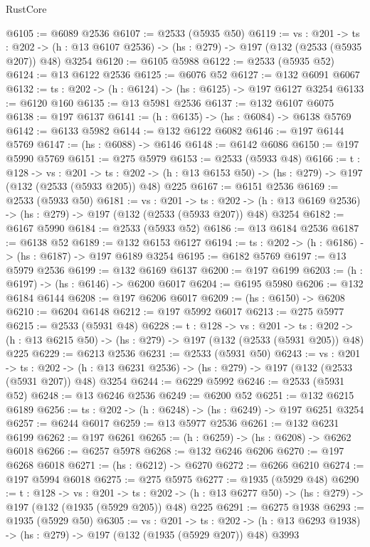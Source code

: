 \begin{lexlean}{RustCore}
\begin{coremodule}
@6105 := @6089 @2536
@6107 := @2533 (@5935 @50)
@6119 := {vs : @201} ->
  {ts : @202} -> (h : @13 @6107 @2536) -> (hs : @279) -> @197 (@132 (@2533 (@5935 @207)) @48) @3254
@6120 := @6105 @5988
@6122 := @2533 (@5935 @52)
@6124 := @13 @6122 @2536
@6125 := @6076 @52
@6127 := @132 @6091 @6067
@6132 := {ts : @202} -> (h : @6124) -> (hs : @6125) -> @197 @6127 @3254
@6133 := @6120 @160
@6135 := @13 @5981 @2536
@6137 := @132 @6107 @6075
@6138 := @197 @6137
@6141 := (h : @6135) -> (hs : @6084) -> @6138 @5769
@6142 := @6133 @5982
@6144 := @132 @6122 @6082
@6146 := @197 @6144 @5769
@6147 := (hs : @6088) -> @6146
@6148 := @6142 @6086
@6150 := @197 @5990 @5769
@6151 := @275 @5979
@6153 := @2533 (@5933 @48)
@6166 := {t : @128} ->
  {vs : @201} ->
  {ts : @202} -> (h : @13 @6153 @50) -> (hs : @279) -> @197 (@132 (@2533 (@5933 @205)) @48) @225
@6167 := @6151 @2536
@6169 := @2533 (@5933 @50)
@6181 := {vs : @201} ->
  {ts : @202} -> (h : @13 @6169 @2536) -> (hs : @279) -> @197 (@132 (@2533 (@5933 @207)) @48) @3254
@6182 := @6167 @5990
@6184 := @2533 (@5933 @52)
@6186 := @13 @6184 @2536
@6187 := @6138 @52
@6189 := @132 @6153 @6127
@6194 := {ts : @202} -> (h : @6186) -> (hs : @6187) -> @197 @6189 @3254
@6195 := @6182 @5769
@6197 := @13 @5979 @2536
@6199 := @132 @6169 @6137
@6200 := @197 @6199
@6203 := (h : @6197) -> (hs : @6146) -> @6200 @6017
@6204 := @6195 @5980
@6206 := @132 @6184 @6144
@6208 := @197 @6206 @6017
@6209 := (hs : @6150) -> @6208
@6210 := @6204 @6148
@6212 := @197 @5992 @6017
@6213 := @275 @5977
@6215 := @2533 (@5931 @48)
@6228 := {t : @128} ->
  {vs : @201} ->
  {ts : @202} -> (h : @13 @6215 @50) -> (hs : @279) -> @197 (@132 (@2533 (@5931 @205)) @48) @225
@6229 := @6213 @2536
@6231 := @2533 (@5931 @50)
@6243 := {vs : @201} ->
  {ts : @202} -> (h : @13 @6231 @2536) -> (hs : @279) -> @197 (@132 (@2533 (@5931 @207)) @48) @3254
@6244 := @6229 @5992
@6246 := @2533 (@5931 @52)
@6248 := @13 @6246 @2536
@6249 := @6200 @52
@6251 := @132 @6215 @6189
@6256 := {ts : @202} -> (h : @6248) -> (hs : @6249) -> @197 @6251 @3254
@6257 := @6244 @6017
@6259 := @13 @5977 @2536
@6261 := @132 @6231 @6199
@6262 := @197 @6261
@6265 := (h : @6259) -> (hs : @6208) -> @6262 @6018
@6266 := @6257 @5978
@6268 := @132 @6246 @6206
@6270 := @197 @6268 @6018
@6271 := (hs : @6212) -> @6270
@6272 := @6266 @6210
@6274 := @197 @5994 @6018
@6275 := @275 @5975
@6277 := @1935 (@5929 @48)
@6290 := {t : @128} ->
  {vs : @201} ->
  {ts : @202} -> (h : @13 @6277 @50) -> (hs : @279) -> @197 (@132 (@1935 (@5929 @205)) @48) @225
@6291 := @6275 @1938
@6293 := @1935 (@5929 @50)
@6305 := {vs : @201} ->
  {ts : @202} -> (h : @13 @6293 @1938) -> (hs : @279) -> @197 (@132 (@1935 (@5929 @207)) @48) @3993

\end{coremodule}
\end{lexlean}
